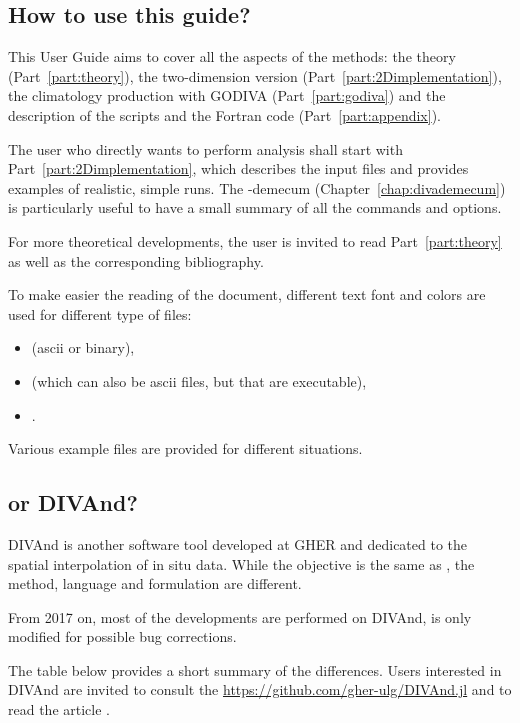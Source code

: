 \newpage


\subsection*{How to use this guide?}

This \diva User Guide aims to cover all the aspects of the methods: the theory (Part~\ref{part:theory}), the two-dimension version (Part~\ref{part:2Dimplementation}), the climatology production with GODIVA (Part~\ref{part:godiva}) and the description of the scripts and the Fortran code (Part~\ref{part:appendix}). 

The user who directly wants to perform analysis shall start with Part~\ref{part:2Dimplementation}, which describes the input files and provides examples of realistic, simple runs. The \diva-demecum (Chapter~\ref{chap:divademecum}) is particularly useful to have a small summary of all the commands and options.

For more theoretical developments, the user is invited to read Part~\ref{part:theory} as well as the corresponding bibliography.

To make easier the reading of the document, different text font and colors are used for different type of files:
\begin{itemize}
\item {} (ascii or binary),
\item {} (which can also be ascii files, but that are executable),
\item {}.
\end{itemize}
Various example files are provided for different situations. 

\subsection*{\diva or DIVAnd?}

DIVAnd is another software tool developed at GHER and dedicated to the spatial interpolation of in situ data. While the objective is the same as \diva, the method, language and formulation are different. 

\info From 2017 on, most of the developments are performed on DIVAnd, \diva is only modified for possible bug corrections.


The table below provides a short summary of the differences. Users interested in DIVAnd are invited to consult the \url{https://github.com/gher-ulg/DIVAnd.jl} and to read the article \citet{BARTH13}.

